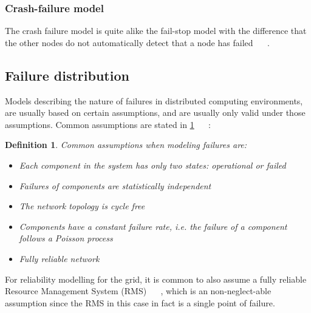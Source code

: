 \documentclass{cslthse-msc}
\newtheorem{definition}{Definition}[chapter]
\begin{document}
\subsubsection{Crash-failure model}
The crash failure model is quite alike the fail-stop model with the difference that the other nodes do not automatically detect that a node has failed ~\cite{faultTolerantFundamentals} ~\cite{adaptiveAgentReplication}.

\subsection{Failure distribution} \label{subsec:background_failure_distribution}
Models describing the nature of failures in distributed computing environments, are usually based on certain assumptions, and are usually only valid under those assumptions. Common assumptions are stated in \cref{def:failure_assumptions} ~\cite{relModelDistSimSystem} \cite{relModelAnalysis}  \cite{cloudServiceRel} \cite{studyServiceRel} \cite{hierarchicalRelModeling} ~\cite{selfAdaptRel}:

\begin{definition} \label{def:failure_assumptions}
Common assumptions when modeling failures are:
\begin{itemize}
	\item Each component in the system has only two states: operational or failed
	\item Failures of components are statistically independent
	\item The network topology is cycle free
	\item Components have a constant failure rate, i.e. the failure of a component follows a Poisson process
	\item Fully reliable network
\end{itemize}
\end{definition}

For reliability modelling for the grid, it is common to also assume a fully reliable Resource Management System (RMS) ~\cite{relAndPerfGridServices} ~\cite{relGridServicePredConstraint}, which is an non-neglect-able assumption since the RMS in this case in fact is a single point of failure.

\end{document}
